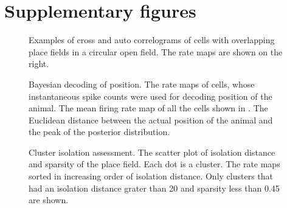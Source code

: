 
\chapter{Supplementary figures} %

\label{supl} %



\begin{figure}
\centering
{}
\end{figure}

\begin{figure}
\ContinuedFloat %
\centering
{}
\caption[]{Examples of cross and auto correlograms of cells with overlapping place fields in a circular open field. The rate maps are shown on the right.}
\label{fig:ccgs}
\end{figure}

\begin{figure}
\centering
{}
\caption[]{Bayesian decoding of position.  The rate maps of cells, whose instantaneous spike counts were used for decoding position of the animal.  The mean firing rate map of all the cells shown in .  The Euclidean distance between the actual position of the animal and the peak of the posterior distribution.}
\label{fig:decodePos}
\end{figure}

\begin{figure}
\centering
{}
\caption[]{Cluster isolation assessment.  The scatter plot of isolation distance and sparsity of the place field. Each dot is a cluster.  The rate maps sorted in increasing order of isolation distance. Only clusters that had an isolation distance grater than 20 and sparsity less than 0.45 are shown.}
\label{fig:cluq}
\end{figure}